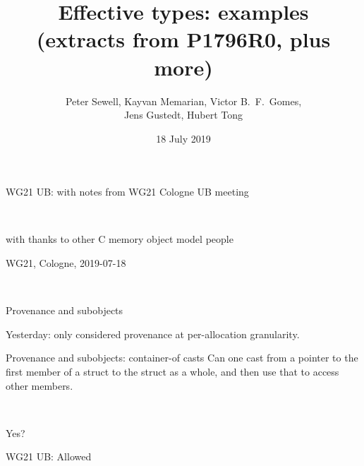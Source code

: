 \documentclass[ignorenonframetext,aspectratio=169]{beamer}
\title{\LARGE Effective types: examples \\(extracts from P1796R0, plus more)}
\author{\Large Peter Sewell, Kayvan Memarian, Victor B.~F.~Gomes, \\Jens
  Gustedt, Hubert Tong}
\date{18 July 2019}
\newcommand{\ub}[1]{{\color{purple}WG21 UB: #1}}
\begin{document}
\begin{frame}
  \titlepage

  \begin{center}
    \ub{with notes from WG21 Cologne UB meeting}

    \
    
  {\scriptsize with thanks to other C memory object model people
    \par
}
\end{center}

\begin{center}
\tiny WG21, Cologne, 2019-07-18

\ 

\end{center}
\end{frame}


\begin{frame}{Provenance and subobjects}

Yesterday: only considered provenance at per-allocation granularity.
\end{frame}

\begin{frame}{Provenance and subobjects: container-of casts}
Can one cast from a pointer to the first
member of a struct to the struct as a whole, and then use that to
access other members.

\

Yes?

\ub{Allowed}

\end{frame}
\end{document}
